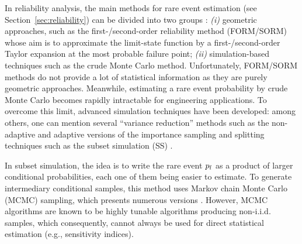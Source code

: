 
In reliability analysis, the main methods for rare event estimation (see Section~\ref{sec:reliability}) can be divided into two groups \citep{MorioBalesdent2015}: 
\textit{(i)} geometric approaches, such as the first-/second-order reliability method (FORM/SORM) whose aim is to approximate the limit-state function by a first-/second-order Taylor expansion at the most probable failure point; 
\textit{(ii)} simulation-based techniques such as the crude Monte Carlo method. 
Unfortunately, FORM/SORM methods do not provide a lot of statistical information as they are purely geometric approaches.
Meanwhile, estimating a rare event probability by crude Monte Carlo becomes rapidly intractable for engineering applications. 
To overcome this limit, advanced simulation techniques have been developed: among others, one can mention several ``variance reduction'' methods such as the non-adaptive and adaptive versions of the importance sampling \citep{RubinsteinKroese1981} and splitting techniques \citep{cerou2012sequential} such as the subset simulation (SS) \citep{AuBeck2001}.

In subset simulation, the idea is to write the rare event $p_\mathrm{f}$ as a product of larger conditional probabilities, each one of them being easier to estimate. 
To generate intermediary conditional samples, this method uses Markov chain Monte Carlo (MCMC) sampling, which presents numerous versions \citep{Papaioannou_PEM_2015}. 
However, MCMC algorithms are known to be highly tunable algorithms producing non-i.i.d. samples, which consequently, cannot always be used for direct statistical estimation (e.g., sensitivity indices). 

